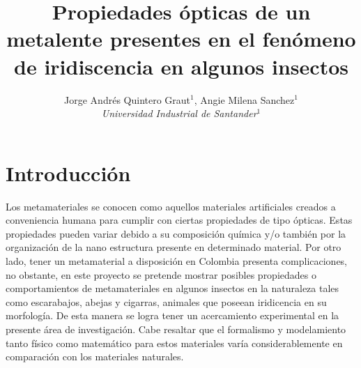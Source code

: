 \documentclass[a4paper, twocolumn, 10pt]{article}
\title{\textbf{ Propiedades ópticas de un metalente presentes en el fenómeno de iridiscencia en algunos insectos}}
\author{Jorge Andrés Quintero Graut$^1$, Angie Milena Sanchez$^1$\\ \textit{Universidad Industrial de Santander$^1$}}
\begin{document}
\sloppy 
{}%

\section*{Introducción}

\noindent Los metamateriales se conocen como aquellos materiales artificiales creados a conveniencia humana para cumplir con ciertas propiedades de tipo ópticas. Estas propiedades pueden variar debido a su composición química y/o también por la organización de la nano estructura presente en determinado material. Por otro lado, tener un metamaterial a disposición en Colombia presenta complicaciones, no obstante, en este proyecto se pretende mostrar posibles propiedades o comportamientos de metamateriales en algunos insectos en la naturaleza tales como escarabajos, abejas y cigarras, animales que poseean iridicencia en su morfología. De esta manera se logra tener un acercamiento experimental en la presente área de investigación. Cabe resaltar que el formalismo y modelamiento tanto físico como matemático para estos materiales varía considerablemente en comparación con los materiales naturales.
\end{document}
